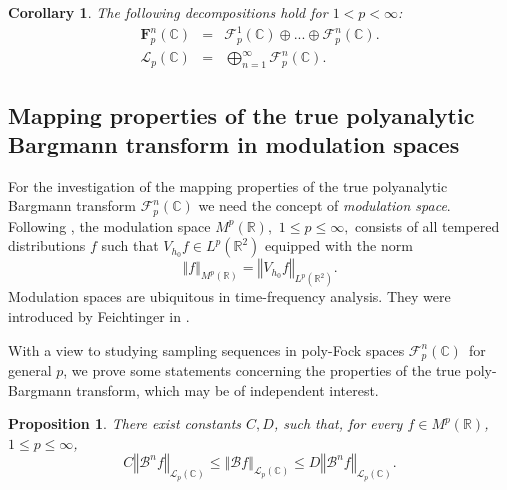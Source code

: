 \documentclass[12pt]{amsart}
\theoremstyle{plain}
\newtheorem{corollary}{Corollary}
\newtheorem{proposition}{Proposition}
\numberwithin{equation}{section}
\begin{document}
\begin{corollary}
The following decompositions hold for $1<p<\infty $: 
\begin{eqnarray*}
\mathbf{F}_{p}^{n}(%
\mathbb{C}
) &=&\mathcal{F}_{p}^{1}(%
\mathbb{C}
)\oplus ...\oplus \mathcal{F}_{p}^{n}(%
\mathbb{C}
). \\
\mathcal{L}_{p}(%
\mathbb{C}
) &=&\bigoplus_{n=1}^{\infty }\mathcal{F}_{p}^{n}(%
\mathbb{C}
).
\end{eqnarray*}
\end{corollary}

\subsection{\protect\bigskip Mapping properties of the true polyanalytic
Bargmann transform in modulation spaces}

For the investigation of the mapping properties of the true polyanalytic
Bargmann transform $\mathcal{F}_{p}^{n}(%
\mathbb{C}
)$ we need the concept of \emph{modulation space}. Following \cite{Charly},
the modulation space $M^{p}(%
\mathbb{R}
),$ $1\leq p\leq \infty ,$ consists of all tempered distributions $f$ such
that $V_{h_{0}}f\in L^{p}(%
\mathbb{R}
^{2})$ equipped with the norm%
\begin{equation*}
\left\Vert f\right\Vert _{M^{p}(%
\mathbb{R}
)}=\left\Vert V_{h_{0}}f\right\Vert _{L^{p}(%
\mathbb{R}
^{2})}\text{.}
\end{equation*}%
Modulation spaces are ubiquitous in time-frequency analysis. They were
introduced by Feichtinger in \cite{FeiModulation}.

With a view to studying sampling sequences in poly-Fock spaces $\mathcal{F}%
_{p}^{n}(%
\mathbb{C}
)$\ for general $p$, we prove some statements concerning the properties of
the true poly-Bargmann transform, which may be of independent interest.

\begin{proposition}
There exist constants $C,D$, such that, for every $f\in M^{p}(%
\mathbb{R}
)$, $1\leq p \leq \infty $, 
\begin{equation}
C\left\Vert \mathcal{B}^{n}f\right\Vert _{\mathcal{L}_{p}(%
\mathbb{C}
)}\leq \left\Vert \mathcal{B}f\right\Vert _{\mathcal{L}_{p}(%
\mathbb{C}
)}\leq D\left\Vert \mathcal{B}^{n}f\right\Vert _{\mathcal{L}_{p}(%
\mathbb{C}
)}\text{.}  \label{constants}
\end{equation}
\end{proposition}
\end{document}
